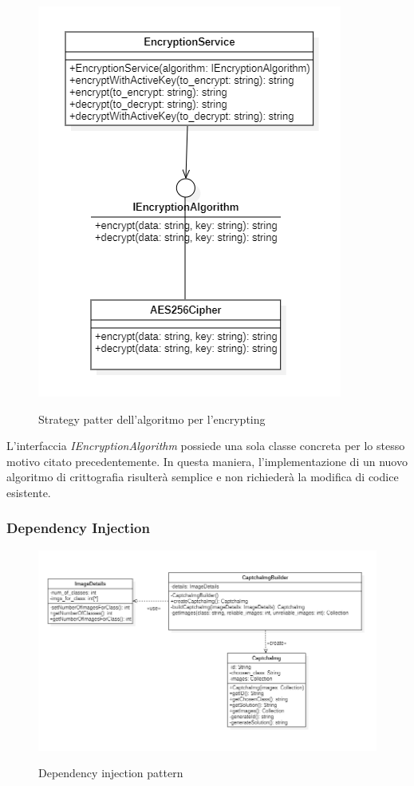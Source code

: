 \begin{figure}[H]
    \centering
    \includegraphics[scale = 0.8]{img/cryptStrategy.png}\\
    \caption{Strategy patter dell'algoritmo per l'encrypting}
\end{figure}

L'interfaccia \textit{IEncryptionAlgorithm} possiede una sola classe concreta per lo stesso motivo citato precedentemente. In questa maniera, l'implementazione di un nuovo algoritmo di crittografia risulterà semplice e non richiederà la modifica di codice esistente.

\subsubsection{Dependency Injection}

\begin{figure}[H]
    \centering
    \includegraphics[scale = 0.8]{img/dependency_injection.png}\\
    \caption{Dependency injection pattern}
\end{figure}

